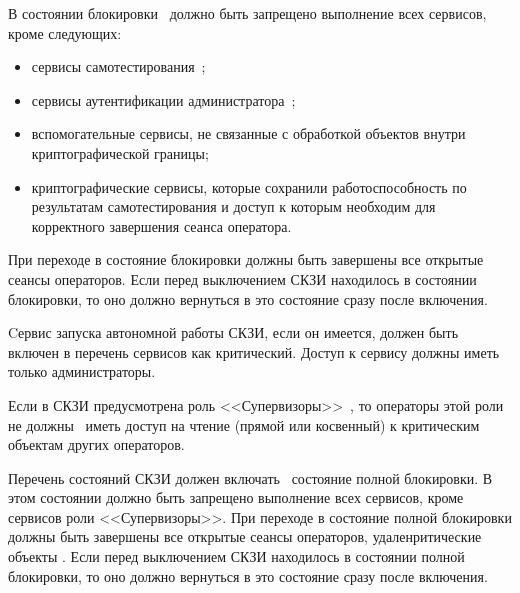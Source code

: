 \label{R.AC.LockState}
В состоянии блокировки~ должно быть запрещено выполнение 
всех сервисов, кроме следующих:
\begin{itemize}
\item
сервисы самотестирования~;
\item
сервисы аутентификации администратора~;
\item
вспомогательные сервисы, не связанные с обработкой объектов внутри 
криптографической границы;
\item
криптографические сервисы, которые сохранили работоспособность по 
результатам самотестирования и доступ к которым необходим для корректного
завершения сеанса оператора.
\end{itemize}
%
При переходе в состояние блокировки должны быть завершены все открытые сеансы 
операторов.
%
Если перед выключением СКЗИ находилось в состоянии блокировки, то оно должно
вернуться в это состояние сразу после включения.

\label{R.AC.Auto}
Cервис запуска автономной работы СКЗИ, если он имеется, 
должен быть~ включен в перечень сервисов как критический.
Доступ к сервису должны иметь~ только администраторы.

\label{R.AC.DevRole}
Если в СКЗИ предусмотрена роль <<Супервизоры>>~,
то операторы этой роли не должны~ иметь доступ 
на чтение (прямой или косвенный) к критическим объектам других операторов.

\label{R.AC.CrashState}
Перечень состояний СКЗИ должен включать~ состояние полной 
блокировки. 
%
В этом состоянии должно быть запрещено выполнение всех сервисов, кроме 
сервисов роли <<Супервизоры>>.
%
При переходе в состояние полной блокировки должны быть завершены 
все открытые сеансы операторов, удаленритические объекты
.
%
Если перед выключением СКЗИ находилось в состоянии полной блокировки, то оно
должно вернуться в это состояние сразу после включения.

